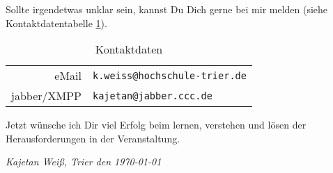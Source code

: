 Sollte irgendetwas unklar sein, kannst Du Dich gerne bei mir melden (siehe Kontaktdatentabelle \ref{kontakt}).
\begin{table}[htp]
\centering
\begin{tabular}{rl}
eMail & \texttt{k.weiss@hochschule-trier.de} \\
jabber/XMPP & \texttt{kajetan@jabber.ccc.de} \\ 
\end{tabular}
\caption{Kontaktdaten}
\label{kontakt}
\end{table}

Jetzt wünsche ich Dir viel Erfolg beim lernen, verstehen und lösen der Herausforderungen in der Veranstaltung.

\vspace{0.5cm}

\textsl{Kajetan Weiß, Trier den \today}